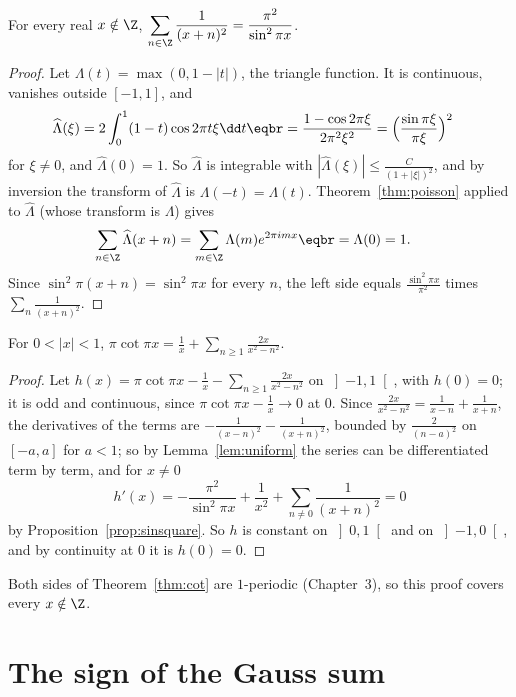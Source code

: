 \begin{proposition}\label{prop:sinsquare}
For every real $x\notin\Z$, $\displaystyle\sum_{n\in\Z}\frac1{(x+n)^2}=\frac{\pi^2}{\sin^2\pi x}$.
\end{proposition}
\begin{proof}
Let $\Lambda(t)=\max(0,1-|t|)$, the triangle function. It is continuous, vanishes outside $[-1,1]$, and
\[
\begin{aligned}\widehat\Lambda(\xi)&=2\int_0^1(1-t)\cos2\pi t\xi\dd t\eqbr=\frac{1-\cos2\pi\xi}{2\pi^2\xi^2}=\Bigl(\frac{\sin\pi\xi}{\pi\xi}\Bigr)^2\end{aligned}
\]
for $\xi\ne0$, and $\widehat\Lambda(0)=1$. So $\widehat\Lambda$ is integrable with $|\widehat\Lambda(\xi)|\le\frac C{(1+|\xi|)^2}$, and by inversion the transform of $\widehat\Lambda$ is
$\Lambda(-t)=\Lambda(t)$. Theorem~\ref{thm:poisson} applied to $\widehat\Lambda$ (whose transform is $\Lambda$) gives
\[
\begin{aligned}\sum_{n\in\Z}\widehat\Lambda(x+n)&=\sum_{m\in\Z}\Lambda(m)e^{2\pi imx}\eqbr=\Lambda(0)=1.\end{aligned}
\]
Since $\sin^2\pi(x+n)=\sin^2\pi x$ for every $n$, the left side equals $\frac{\sin^2\pi x}{\pi^2}$ times $\sum_n\frac1{(x+n)^2}$.
\end{proof}

\begin{corollary}
For $0<|x|<1$, $\pi\cot\pi x=\frac1x+\sum_{n\ge1}\frac{2x}{x^2-n^2}$.
\end{corollary}
\begin{proof}
Let $h(x)=\pi\cot\pi x-\frac1x-\sum_{n\ge1}\frac{2x}{x^2-n^2}$ on $\left]-1,1\right[$, with $h(0)=0$; it is odd and continuous, since $\pi\cot\pi x-\frac1x\to0$ at $0$. Since
$\frac{2x}{x^2-n^2}=\frac1{x-n}+\frac1{x+n}$, the derivatives of the terms are $-\frac1{(x-n)^2}-\frac1{(x+n)^2}$, bounded by $\frac2{(n-a)^2}$ on $[-a,a]$ for $a<1$; so
by Lemma~\ref{lem:uniform} the series can be differentiated term by term, and for $x\ne0$
\[
h'(x)=-\frac{\pi^2}{\sin^2\pi x}+\frac1{x^2}+\sum_{n\ne0}\frac1{(x+n)^2}=0
\]
by Proposition~\ref{prop:sinsquare}. So $h$ is constant on $\left]0,1\right[$ and on $\left]-1,0\right[$, and by continuity at $0$ it is $h(0)=0$.
\end{proof}

Both sides of Theorem~\ref{thm:cot} are $1$-periodic (Chapter~3), so this proof covers every $x\notin\Z$.

\section{The sign of the Gauss sum}

